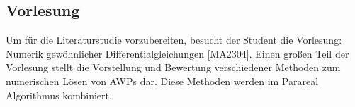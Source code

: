 \documentclass[12pt,a4paper]{article}
\begin{document}
\subsection*{Vorlesung}

Um für die Literaturstudie vorzubereiten, besucht der Student die Vorlesung: Numerik gewöhnlicher Differentialgleichungen [MA2304]. Einen großen Teil der Vorlesung stellt die Vorstellung und Bewertung verschiedener Methoden zum numerischen Lösen von AWPs dar. Diese Methoden werden im Parareal Algorithmus kombiniert.



\end{document}
